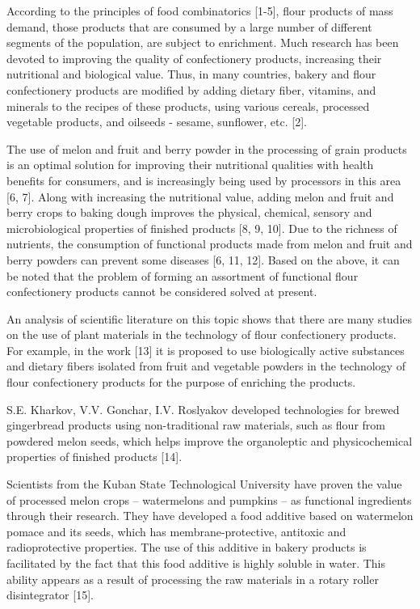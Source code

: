 According to the principles of food combinatorics {[}1-5{]}, flour
products of mass demand, those products that are consumed by a large
number of different segments of the population, are subject to
enrichment. Much research has been devoted to improving the quality of
confectionery products, increasing their nutritional and biological
value. Thus, in many countries, bakery and flour confectionery products
are modified by adding dietary fiber, vitamins, and minerals to the
recipes of these products, using various cereals, processed vegetable
products, and oilseeds - sesame, sunflower, etc. {[}2{]}.

The use of melon and fruit and berry powder in the processing of grain
products is an optimal solution for improving their nutritional
qualities with health benefits for consumers, and is increasingly being
used by processors in this area {[}6, 7{]}. Along with increasing the
nutritional value, adding melon and fruit and berry crops to baking
dough improves the physical, chemical, sensory and microbiological
properties of finished products {[}8, 9, 10{]}. Due to the richness of
nutrients, the consumption of functional products made from melon and
fruit and berry powders can prevent some diseases {[}6, 11, 12{]}. Based
on the above, it can be noted that the problem of forming an assortment
of functional flour confectionery products cannot be considered solved
at present.

An analysis of scientific literature on this topic shows that there are
many studies on the use of plant materials in the technology of flour
confectionery products. For example, in the work {[}13{]} it is proposed
to use biologically active substances and dietary fibers isolated from
fruit and vegetable powders in the technology of flour confectionery
products for the purpose of enriching the products.

S.E. Kharkov, V.V. Gonchar, I.V. Roslyakov developed technologies for
brewed gingerbread products using non-traditional raw materials, such as
flour from powdered melon seeds, which helps improve the organoleptic
and physicochemical properties of finished products {[}14{]}.

Scientists from the Kuban State Technological University have proven the
value of processed melon crops -- watermelons and pumpkins -- as
functional ingredients through their research. They have developed a
food additive based on watermelon pomace and its seeds, which has
membrane-protective, antitoxic and radioprotective properties. The use
of this additive in bakery products is facilitated by the fact that this
food additive is highly soluble in water. This ability appears as a
result of processing the raw materials in a rotary roller disintegrator
{[}15{]}.

